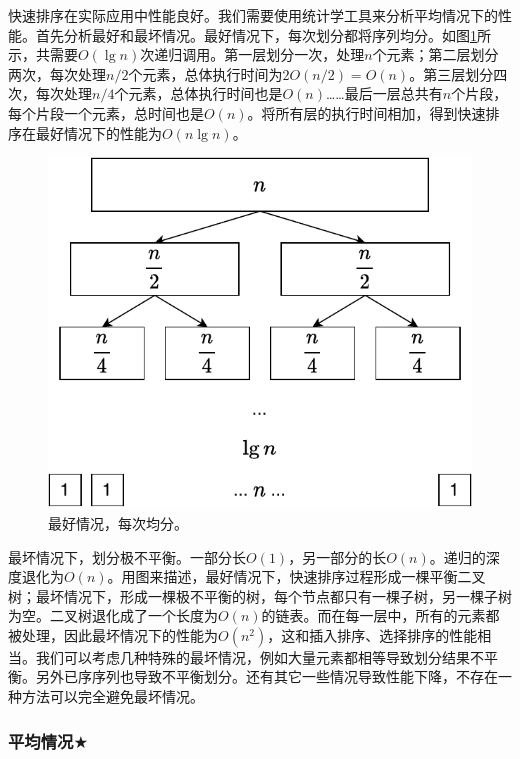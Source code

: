 \documentclass[b5paper]{ctexart}
\begin{document}
快速排序在实际应用中性能良好。我们需要使用统计学工具来分析平均情况下的性能。首先分析最好和最坏情况。最好情况下，每次划分都将序列均分。如图\ref{fig:qsort-best}所示，共需要$O(\lg n)$次递归调用。第一层划分一次，处理$n$个元素；第二层划分两次，每次处理$n/2$个元素，总体执行时间为$2 O(n/2) = O(n)$。第三层划分四次，每次处理$n/4$个元素，总体执行时间也是$O(n)$……最后一层总共有$n$个片段，每个片段一个元素，总时间也是$O(n)$。将所有层的执行时间相加，得到快速排序在最好情况下的性能为$O(n \lg n)$。

\begin{figure}[htbp]
 \centering
 \includegraphics[scale=0.55]{img/qsort-best}
 \caption{最好情况，每次均分。}
 \label{fig:qsort-best}
\end{figure}

最坏情况下，划分极不平衡。一部分长$O(1)$，另一部分的长$O(n)$。递归的深度退化为$O(n)$。用图来描述，最好情况下，快速排序过程形成一棵平衡二叉树；最坏情况下，形成一棵极不平衡的树，每个节点都只有一棵子树，另一棵子树为空。二叉树退化成了一个长度为$O(n)$的链表。而在每一层中，所有的元素都被处理，因此最坏情况下的性能为$O(n^2)$，这和插入排序、选择排序的性能相当。我们可以考虑几种特殊的最坏情况，例如大量元素都相等导致划分结果不平衡。另外已序序列也导致不平衡划分。还有其它一些情况导致性能下降，不存在一种方法可以完全避免最坏情况。

\subsubsection{平均情况\texorpdfstring{$\bigstar$}{★}}
\end{document}
